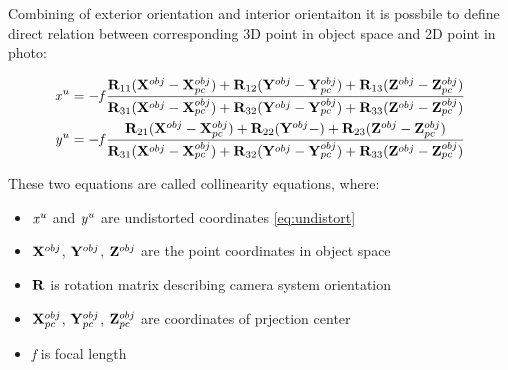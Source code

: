 \documentclass[a4paper,12pt]{report}
\newcommand{\ematr}[1]{
{\bf #1}
}
\newcommand{\evect}[1]{
{\bf #1}
}
\newcommand{\escal}[1]{
{\it #1}
}
\begin{document}
Combining of exterior orientation and interior orientaiton it is possbile to define 
direct relation between corresponding 3D point in object space and 2D point
in photo:

\begin{equation}
\label{eq:col_eqs}
\begin{split}
&\escal{x}^{u} = -\escal{f}\frac{\ematr{R}_{11}(\evect{X}^{obj} - \evect{X}^{obj}_{pc}) + 
                                  \ematr{R}_{12}(\evect{Y}^{obj} - \evect{Y}^{obj}_{pc}) + 
                                  \ematr{R}_{13}(\evect{Z}^{obj} - \evect{Z}^{obj}_{pc})                                  
                                  }{
				  \ematr{R}_{31}(\evect{X}^{obj} - \evect{X}^{obj}_{pc}) + 
                                  \ematr{R}_{32}(\evect{Y}^{obj} - \evect{Y}^{obj}_{pc}) + 
                                  \ematr{R}_{33}(\evect{Z}^{obj} - \evect{Z}^{obj}_{pc})     
                                  } \\
&\escal{y}^{u} = -\escal{f}\frac{\ematr{R}_{21}(\evect{X}^{obj} - \evect{X}^{obj}_{pc}) + 
                                  \ematr{R}_{22}(\evect{Y}^{obj} - ) + 
                                  \ematr{R}_{23}(\evect{Z}^{obj} - \evect{Z}^{obj}_{pc})                                  
                                  }{
				  \ematr{R}_{31}(\evect{X}^{obj} - \evect{X}^{obj}_{pc}) + 
                                  \ematr{R}_{32}(\evect{Y}^{obj} - \evect{Y}^{obj}_{pc}) + 
                                  \ematr{R}_{33}(\evect{Z}^{obj} - \evect{Z}^{obj}_{pc})     
                                  }
\end{split}
\end{equation}

These two equations are called collinearity equations, where:
\begin{itemize}
  \item $\escal{x}^{u}$ and $\escal{y}^{u}$ are undistorted coordinates \eqref{eq:undistort}
  \item $\evect{X}^{obj}$, $\evect{Y}^{obj}$, $\evect{Z}^{obj}$ are the point coordinates in object space
  \item $\ematr{R}$ is rotation matrix describing camera system orientation
  \item $\evect{X}^{obj}_{pc}$, $\evect{Y}^{obj}_{pc}$, $\evect{Z}^{obj}_{pc}$ are coordinates of prjection center
  \item \escal{f} is focal length
\end{itemize}
\end{document}
